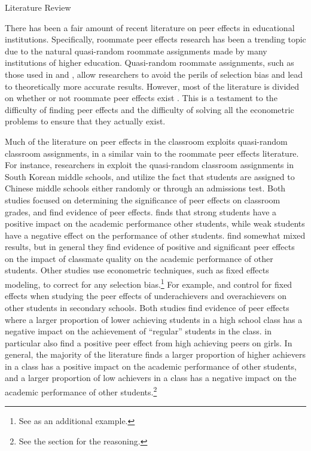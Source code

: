 \documentclass[12pt,a4paper,english,fleqn]{article}
\makeatletter
\renewcommand\section{\@startsection{section}{1}{\z@}
{-5ex \@plus -1ex \@minus -.2ex}{2.3ex \@plus.2ex}{\normalfont\large\bf}}
\makeatother
\begin{document}
\section{Literature Review}\label{litreview}

There has been a fair amount of recent literature on peer effects in educational institutions.
Specifically, roommate peer effects research has been a trending topic due to the natural quasi-random roommate assignments made by many institutions of higher education.
Quasi-random roommate assignments, such as those used in \citet{griffith2014peer} and \citet{zimmerman2003peer}, allow researchers to avoid the perils of selection bias and lead to theoretically more accurate results.
However, most of the literature is divided on whether or not roommate peer effects exist \citep{griffith2014peer,zimmerman2003peer,sacerdote2000peer,foster2006s,mcewan2006roommate}.
This is a testament to the difficulty of finding peer effects and the difficulty of solving all the econometric problems to ensure that they actually exist.

Much of the literature on peer effects in the classroom exploits quasi-random classroom assignments, in a similar vain to the roommate peer effects literature.
For instance, researchers in \citet{kang2007classroom} exploit the quasi-random classroom assignments in South Korean middle schools, and \citet{carman2012classroom} utilize the fact that students are assigned to Chinese middle schools either randomly or through an admissions test.
Both studies focused on determining the significance of peer effects on classroom grades, and find evidence of peer effects.
\citet{kang2007classroom} finds that strong students have a positive impact on the academic performance other students, while weak students have a negative effect on the performance of other students. 
\citet{carman2012classroom} find somewhat mixed results, but in general they find evidence of positive and significant peer effects on the impact of classmate quality on the academic performance of other students.
Other studies use econometric techniques, such as fixed effects modeling, to correct for any selection bias.\footnote{See \citet{burke2013classroom} as an additional example.}
For example, \citet{schlosser2008inside} and \citet{lavy2012good} control for fixed effects when studying the peer effects of underachievers and overachievers on other students in secondary schools.
Both studies find evidence of peer effects where a larger proportion of lower achieving students in a high school class has a negative impact on the achievement of ``regular'' students in the class.
\citet{lavy2012good} in particular also find a positive peer effect from high achieving peers on girls.
In general, the majority of the literature finds a larger proportion of higher achievers in a class has a positive impact on the academic performance of other students, and a larger proportion of low achievers in a class has a negative impact on the academic performance of other students.\footnote{See the  section for the reasoning.}
\end{document}
